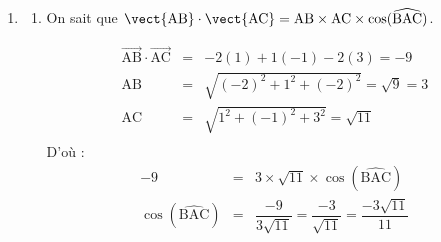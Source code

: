 \begin{enumerate}
\begin{enumerate}
\item Le point H appartient à $(d)$, il existe donc $t \in \mathbb{R}$ tel que $\left\{ \begin{matrix} x_{\text{H}}&=&3+\phantom{4}t \\y_{\text{H}}&=& -2+4t \\ z_{\text{H}}&=& -1+\phantom{4}t \end{matrix} \right.$. De plus H appartient au plan (ABC), ses coordonnées vérifient donc l'équation du plan (ABC): $x_{\text{H}}+4y_{\text{H}}+z_{\text{H}}- 12 = 0$. On en déduit que $t$ est solution de :
\[
\begin{array}{rcl}
(3 + t) + 4(-2 + 4t) + (-1 + t) - 12 &=& 0 \\
3 + t - 8 + 16t - 1 + t - 12 &=& 0 \\
18t - 18 &=& 0 \\
t &=& 1
\end{array}
\]
Les coordonnées de H sont donc $x_{\text{H}} = 3 + 1 = 4$, $y_{\text{H}} = -2 + 4(1) = 2$, $z_{\text{H}} = -1 + 1 = 0$. Soit H$(4~;~2~;~0)$.

\item La distance de D au plan (ABC) correspond à la longueur DH :
\[
\begin{array}{rcl}
\text{DH} &=& \sqrt{(4 - 3)^2 + (2 - (-2))^2 + (0 - (-1))^2} \\
&=& \sqrt{1^2 + 4^2 + 1^2} \\
&=& \sqrt{18} = 3\sqrt{2}
\end{array}
\]
\end{enumerate}

\item 
\begin{enumerate}
\item On sait que $\vect{\text{AB}} \cdot \vect{\text{AC}} = \text{AB} \times \text{AC} \times \cos(\widehat{\text{BAC}})$.

\[
\begin{array}{rcl}
\overrightarrow{\text{AB}} \cdot \overrightarrow{\text{AC}} &=& -2(1) + 1(-1) - 2(3) = -9 \\
\text{AB} &=& \sqrt{(-2)^2 + 1^2 + (-2)^2} = \sqrt{9} = 3 \\
\text{AC} &=& \sqrt{1^2 + (-1)^2 + 3^2} = \sqrt{11} \\
\end{array}
\]
D'où :
\[
\begin{array}{rcl}
-9 &=& 3 \times \sqrt{11} \times \cos(\widehat{\text{BAC}}) \\
\cos(\widehat{\text{BAC}}) &=& \dfrac{-9}{3\sqrt{11}} = \dfrac{-3}{\sqrt{11}} = \dfrac{-3\sqrt{11}}{11}
\end{array}
\]


\end{enumerate}
\end{enumerate}
